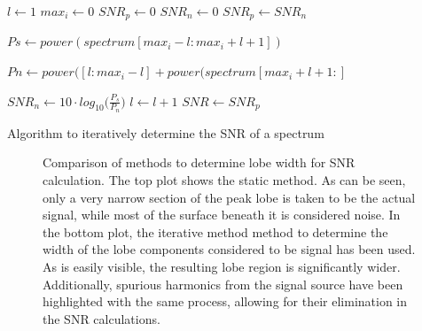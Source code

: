 \begin{algorithm}
    \centering
    \begin{algorithmic}
    \State $l\gets 1$
    \State $max_i\gets 0$
    \State $SNR_p\gets 0$
    \State $SNR_n\gets 0$
        \State $SNR_p\gets SNR_n$

        \State $Ps\gets power(spectrum[max_i - l:max_i + l + 1])$

        \State $Pn\gets power([l:max_i - l] + power(spectrum[max_i + l + 1:]$

        \State $SNR_n\gets 10\cdot log_{10}\Bigg(\frac{P_s}{P_n}\Bigg)$
        \State $l\gets l + 1$
    \EndWhile
    \State $SNR\gets SNR_p$
    \end{algorithmic}
    \caption[Iterative SNR Algorithm]{Algorithm to iteratively determine the SNR of a spectrum}
    \label{alg:gui:snr}
\end{algorithm}

\begin{figure}
    \centering
    
    \caption[SNR comparison]{%
        Comparison of methods to determine lobe width for SNR calculation. The
        top plot shows  the static method. As can be seen,  only a very narrow
        section of the peak lobe is taken  to be the actual signal, while most
        of the surface beneath it is considered noise.\protect\newline
        In the bottom plot, the iterative method method to determine the width
        of  the  lobe  components  considered  to be  signal  has  been  used.
        As  is easily  visible,  the resulting  lobe  region is  significantly
        wider. Additionally, spurious  harmonics from  the signal  source have
        been highlighted with the same process, allowing for their elimination
        in the SNR calculations.%
    }
    \label{fig:gui:snr_comparison}
\end{figure}

